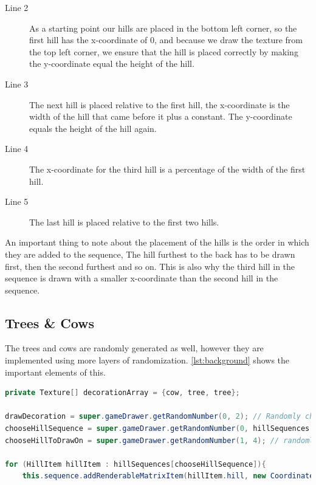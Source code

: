 \begin{description}
\item[Line 2] As a starting point our hills are placed in the bottom left corner, so the first hill has the x-coordinate of 0, and because we draw the texture from the top left corner, we ensure that the hill is placed correctly by making the y-coordinate equal the height of the hill. 
\item[Line 3] The next hill is placed relative to the first hill, the x-coordinate is the width of the hill that came before it plus a constant. The y-coordinate equals the height of the hill again.
\item[Line 4] The x-coordinate for the third hill is a percentage of the width of the first hill. 
\item[Line 5] The last hill is placed relative to the first two hills.
\end{description}

An important thing to note about the placement of the hills is the order in which they are added to the sequence, The hill furthest to the back has to be drawn first, then the second furthest and so on. This is also why the third hill in the sequence is drawn with a smaller x-coordinate than the second hill in the sequence.

\subsection{Trees \& Cows}

The trees and cows are randomly generated as well, however they are implemented using more layers of randomization. \autoref{lst:background} shows the important elements of this.

\begin{lstlisting}[language=java,firstnumber=1,caption={Selection of background.},label=lst:background]
private Texture[] decorationArray = {cow, tree, tree};

drawDecoration = super.gameDrawer.getRandomNumber(0, 2); // Randomly chosen which decoration to draw (cow = 0, tree = 1, tree = 2)
chooseHillSequence = super.gameDrawer.getRandomNumber(0, hillSequences.length-1); // randomly choose which hill sequence to draw
chooseHillToDrawOn = super.gameDrawer.getRandomNumber(1, 4); // randomly choose which hill to draw on (small_hill = 1, medium_hill = 2, large_hill = 3, larger_hill = 4)
    		
for (HillItem hillItem : hillSequences[chooseHillSequence]){
	this.sequence.addRenderableMatrixItem(hillItem.hill, new Coordinate(i + hillItem.x, hillItem.y, 0f));
\end{lstlisting}

